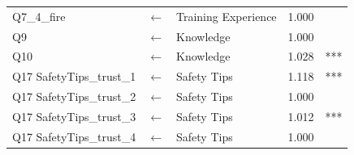 \begin{table}[h]
\begin{tabular}{|l|c|l|c|c|}
  Q7\_4\_fire & $\longleftarrow$ & Training Experience & 1.000 & \\
  Q9             & $\longleftarrow$ & Knowledge & 1.000 & \\
  Q10           & $\longleftarrow$ & Knowledge & 1.028 & *** \\
  Q17 SafetyTips\_trust\_1 & $\longleftarrow$ & Safety Tips & 1.118 & *** \\
  Q17 SafetyTips\_trust\_2 & $\longleftarrow$ & Safety Tips & 1.000 & \\
  Q17 SafetyTips\_trust\_3 & $\longleftarrow$ & Safety Tips & 1.012 & *** \\
  Q17 SafetyTips\_trust\_4 & $\longleftarrow$ & Safety Tips & 1.000 & \\
 \hline
  \end{tabular}
\end{table}

